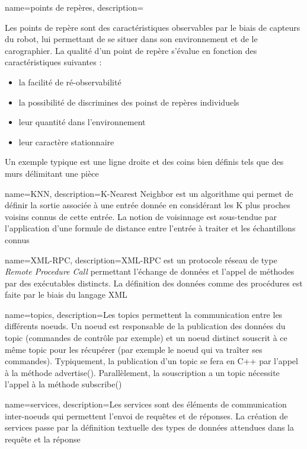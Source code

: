 {
  name={points de repères},
    description={Les points de repère sont des caractéristiques observables par le biais de capteurs du robot, lui permettant de se situer dans son environnement et de le carographier. 
    La qualité d'un point de repère s'évalue en fonction des caractéristiques suivantes :
    \begin{itemize}
    \item la facilité de ré-observabilité
    \item la possibilité de discrimines des poinst de repères individuels 
    \item leur quantité dans l'environnement
    \item leur caractère stationnaire
    \end{itemize}
    Un exemple typique est une ligne droite et des coins bien définis tels que des murs délimitant une pièce}
}

{
  name={KNN},
    description={K-Nearest Neighbor est un algorithme qui permet de définir la sortie associée à une entrée donnée en considérant les K plus proches voisins connus de cette entrée. 
    La notion de voisinnage est sous-tendue par l'application d'une formule de distance entre l'entrée à traiter et les échantillons connus}
}

{
  name={XML-RPC},
    description={XML-RPC est un protocole réseau de type \emph{Remote Procedure Call} permettant l'échange de données et l'appel de méthodes par des exécutables distincts. La définition des données 
    comme des procédures est faite par le biais du langage XML}
}

{
  name={topics},
    description={Les topics permettent la communication entre les différents noeuds. 
    Un noeud est responsable de la publication des données du topic (commandes de contrôle par exemple) et un noeud distinct souscrit à ce même topic pour les récupérer (par exemple le noeud qui va traîter ses commandes).
    Typiquement, la publication d'un topic se fera en C++ par l'appel à la méthode advertise().
    Parallèlement, la souscription a un topic nécessite l'appel à la méthode subscribe()}
}

{
  name={services},
    description={Les services sont des éléments de communication inter-noeuds qui permettent l'envoi de requêtes et de réponses. 
    La création de services passe par la définition textuelle des types de données attendues dans la requête et la réponse}
}

